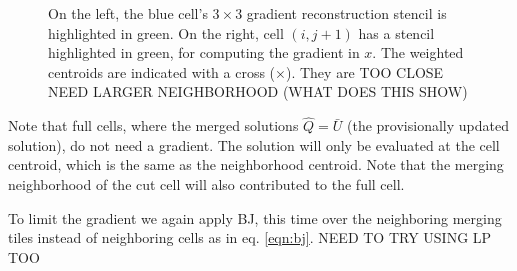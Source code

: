 \begin{enumerate}
\begin{figure}
    \centering
     \hfill
    \caption{\sf On the left, the blue cell's $3\times3$ gradient reconstruction 
    stencil  is highlighted in green. On the right, cell $(i,j+1)$ has a
    stencil highlighted in green, for computing the gradient in $x$. 
    The weighted centroids are indicated with a cross ($\times$).
    They are TOO CLOSE NEED LARGER NEIGHBORHOOD (WHAT DOES THIS SHOW)}
    \label{fig:tooclose}
\end{figure}

Note that full cells, where the merged  solutions $\widehat{Q} =
\bar{U}$ (the
provisionally updated solution), do not need a gradient. The solution will only be
evaluated at the cell centroid, which is the same as the neighborhood centroid. 
Note that the merging neighborhood of the cut cell will
also contributed to the full cell.

To limit the gradient we again apply BJ, this time over the neighboring merging tiles 
instead of neighboring cells as in eq. \eqref{eqn:bj}.  NEED TO TRY USING LP TOO



\end{enumerate}
